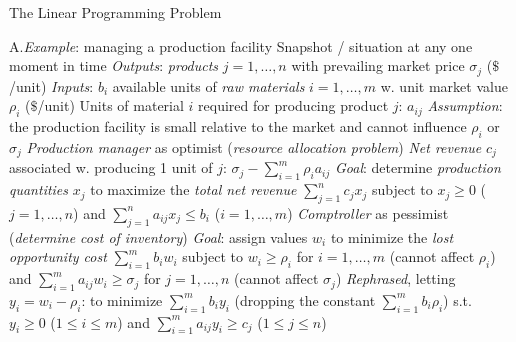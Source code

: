 \beginsection The Linear Programming Problem

\item{A.}\emph{Example}: managing a production facility\smallskip
{}Snapshot / situation at any one moment in time\smallskip
{}\emph{Outputs}: \emph{products} $j=1,\ldots,n$ with prevailing
market price $\sigma_j$ ($\$$/unit) \smallskip
{}\emph{Inputs}: $b_i$ available units of \emph{raw materials} $i=1,
\ldots,m$ w. unit market value $\rho_i$ ($\$$/unit)\smallskip
{}Units of material $i$ required for producing product $j$: $a_{ij}$
\smallskip
{}\emph{Assumption}: the production facility is small relative to the
market and cannot influence $\rho_i$ or $\sigma_j$\smallskip
{}\emph{Production manager} as optimist (\emph{resource allocation
problem})\smallskip
{}\emph{Net revenue} $c_j$ associated w. producing 1 unit of $j$:
$\sigma_j-\sum_{i=1}^m\rho_ia_{ij}$\smallskip
{}\emph{Goal}: determine \emph{production quantities} $x_j$ to
maximize the \emph{total net revenue} $\sum_{j=1}^nc_jx_j$ subject to
$x_j\geq 0$ ($j=1,\ldots,n$) and $\sum_{j=1}^na_{ij}x_j\leq b_i$ ($i=1,\ldots,
m$)\smallskip
{}\emph{Comptroller} as pessimist (\emph{determine cost of inventory})
\smallskip
{}\emph{Goal}: assign values $w_i$ to minimize the \emph{lost
opportunity cost} $\sum_{i=1}^mb_iw_i$ subject to $w_i\geq\rho_i$ for $i=1,
\ldots,m$ (cannot affect $\rho_i$) and $\sum_{i=1}^ma_{ij}w_i\geq\sigma_j$ for
$j=1,\ldots,n$ (cannot affect $\sigma_j$)\smallskip
{}\emph{Rephrased}, letting $y_i=w_i-\rho_i$: to minimize 
$\sum_{i=1}^mb_iy_i$ (dropping the constant $\sum_{i=1}^mb_i\rho_i$) s.t.
$y_i\geq 0$ ($1\leq i\leq m$) and $\sum_{i=1}^ma_{ij}y_i\geq c_j$ ($1\leq j\leq
n$)\smallskip

